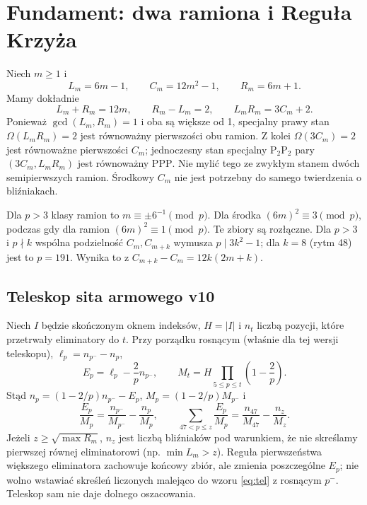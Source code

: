 \documentclass[11pt,a4paper]{article}
\theoremstyle{definition}\newtheorem{defn}[tw]{Definicja}
\theoremstyle{remark}\newtheorem*{uw}{Uwaga}
\begin{document}
\section{Fundament: dwa ramiona i Reguła Krzyża}
Niech $m\ge1$ i
\[
 L_m=6m-1,\qquad C_m=12m^2-1,\qquad R_m=6m+1.
\]
Mamy dokładnie
\begin{equation}\label{eq:cross}
 L_m+R_m=12m,\qquad R_m-L_m=2,\qquad L_mR_m=3C_m+2.
\end{equation}
Ponieważ $\gcd(L_m,R_m)=1$ i oba są większe od 1, specjalny prawy stan
$\Omega(L_mR_m)=2$ jest równoważny pierwszości obu ramion. Z kolei
$\Omega(3C_m)=2$ jest równoważne pierwszości $C_m$; jednoczesny stan
specjalny $\mathrm{P}_2\mathrm{P}_2$ pary $(3C_m,L_mR_m)$ jest równoważny
$\mathrm{PPP}$. Nie mylić tego ze zwykłym stanem dwóch semipierwszych ramion.
Środkowy $C_m$ nie jest potrzebny do samego twierdzenia o bliźniakach.

Dla $p>3$ klasy ramion to $m\equiv\pm6^{-1}\pmod p$. Dla środka
$(6m)^2\equiv3\pmod p$, podczas gdy dla ramion $(6m)^2\equiv1\pmod p$.
Te zbiory są rozłączne. Dla $p>3$ i $p\nmid k$ wspólna podzielność
$C_m,C_{m+k}$ wymusza $p\mid3k^2-1$; dla $k=8$ (rytm 48) jest to $p=191$.
Wynika to z $C_{m+k}-C_m=12k(2m+k)$.

\subsection{Teleskop sita armowego v10}
Niech $I$ będzie skończonym oknem indeksów, $H=|I|$ i $n_t$ liczbą
pozycji, które przetrwały eliminatory do $t$. Przy porządku rosnącym
(właśnie dla tej wersji teleskopu), $\ell_p=n_{p^-}-n_p$,
\[
 E_p=\ell_p-\frac2p n_{p^-},\qquad M_t=H\prod_{5\le p\le t}\left(1-\frac2p\right).
\]
Stąd $n_p=(1-2/p)n_{p^-}-E_p$, $M_p=(1-2/p)M_{p^-}$ i
\begin{equation}\label{eq:tel}
 \frac{E_p}{M_p}=\frac{n_{p^-}}{M_{p^-}}-\frac{n_p}{M_p},\qquad
 \sum_{47<p\le z}\frac{E_p}{M_p}=\frac{n_{47}}{M_{47}}-\frac{n_z}{M_z}.
\end{equation}
Jeżeli $z\ge\sqrt{\max R_m}$, $n_z$ jest liczbą bliźniaków pod warunkiem,
że nie skreślamy pierwszej równej eliminatorowi (np. $\min L_m>z$).
Reguła pierwszeństwa większego eliminatora zachowuje końcowy zbiór, ale
zmienia poszczególne $E_p$; nie wolno wstawiać skreśleń liczonych malejąco do
wzoru \eqref{eq:tel} z rosnącym $p^-$. Teleskop sam nie daje dolnego oszacowania.
\end{document}
